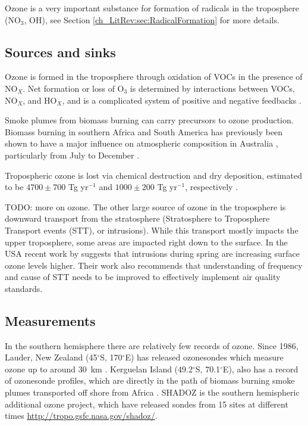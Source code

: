     Ozone is a very important substance for formation of radicals in the troposphere (NO$_3$, OH), see Section \ref{ch_LitRev:sec:RadicalFormation} for more details.
    
    
  \subsection{Sources and sinks}
  
    Ozone is formed in the troposphere through oxidation of VOCs in the presence of NO$_X$.
    Net formation or loss of O$_3$ is determined by interactions between VOCs, NO$_X$, and HO$_X$, and is a complicated system of positive and negative feedbacks \citep{Atkinson2000}.
    
    Smoke plumes from biomass burning can carry precursors to ozone production.
    Biomass burning in southern Africa and South America has previously been shown to have a major influence on atmospheric composition in Australia \citep{Oltmans2001, Gloudemans2006, Edwards2006}, particularly from July to December \citep{Pak2003, Liu2016}.

    Tropospheric ozone is lost via chemical destruction and dry deposition, estimated to be $4700\pm700$ Tg yr$^{-1}$ and $1000\pm200$ Tg yr$^{-1}$, respectively \citep{Stevenson2006}. 

    TODO: more on ozone.
    The other large source of ozone in the troposphere is downward transport from the stratosphere (Stratosphere to Troposphere Transport events (STT), or intrusions).
    While this transport mostly impacts the upper troposphere, some areas are impacted right down to the surface.
    In the USA recent work by \cite{Lin2015} suggests that intrusions during spring are increasing surface ozone levels higher.
    Their work also recommends that understanding of frequency and cause of STT needs to be improved to effectively implement air quality standards.
  
  \subsection{Measurements}
    
    In the southern hemisphere there are relatively few records of ozone.
    Since 1986, Lauder, New Zealand (45$^{\circ}$S, 170$^{\circ}$E) has released ozonesondes which measure ozone up to around 30~km \citep{Brinksma2002}.
    Kerguelan Island (49.2$^{\circ}$S, 70.1$^{\circ}$E), also has a record of ozonesonde profiles, which are directly in the path of biomass burning smoke plumes transported off shore from Africa \citep{Baray2012}.
    SHADOZ is the southern hemispheric additional ozone project, which have released sondes from 15 sites at different times \url{http://tropo.gsfc.nasa.gov/shadoz/}.
    
